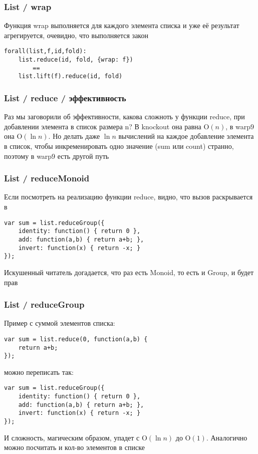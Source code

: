 \documentclass[xetex]{beamer}
\begin{document}
\begin{frame}[fragile]
\frametitle{List / wrap}
Функция wrap выполняется для каждого элемента списка и уже её результат агрегируется, очевидно, что выполняется закон

\vspace{10mm}
\begin{lstlisting}
forall(list,f,id,fold): 
    list.reduce(id, fold, {wrap: f}) 
        == 
    list.lift(f).reduce(id, fold)
\end{lstlisting}
\end{frame}


\begin{frame}[fragile]
\frametitle{List / reduce / эффективность}
Раз мы заговорили об эффективности, какова сложноть у функции reduce, при добавлении элемента в список размера n? В knockout она равна $\mathrm{O}(n)$, в warp9 она $\mathrm{O}(\ln n)$. Но делать даже $\ln n$ вычислений на каждое добавление элемента в список, чтобы инкременировать одно значение (sum или count) странно, поэтому в warp9 есть другой путь
\end{frame}


\begin{frame}[fragile]
\frametitle{List / reduceMonoid}
Если посмотреть на реализацию функции reduce, видно, что вызов \quad раскрывается в 
\vspace{4mm}
\begin{lstlisting}
var sum = list.reduceGroup({
    identity: function() { return 0 },
    add: function(a,b) { return a+b; },
    invert: function(x) { return -x; }
});
\end{lstlisting}
\vspace{4mm}
Искушенный читатель догадается, что раз есть Monoid, то есть и Group, и будет прав
\end{frame}


\begin{frame}[fragile]
\frametitle{List / reduceGroup}
Пример с суммой элементов списка:
\begin{lstlisting}[frame=none]
var sum = list.reduce(0, function(a,b) { 
    return a+b; 
});
\end{lstlisting}
можно переписать так:
\begin{lstlisting}[frame=none]
var sum = list.reduceGroup({
    identity: function() { return 0 },
    add: function(a,b) { return a+b; },
    invert: function(x) { return -x; }
});
\end{lstlisting}

\vspace{4mm}
И сложность, магическим образом, упадет с $\mathrm{O}(\ln n)$ до $\mathrm{O}(1)$. Аналогично можно посчитать и кол-во элементов в списке
\end{frame}
\end{document}
